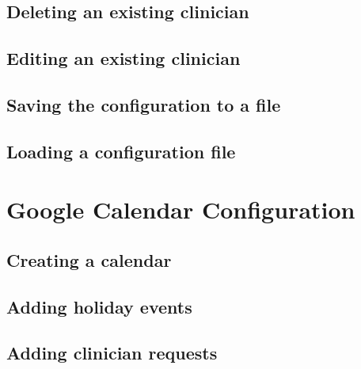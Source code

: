 \documentclass[letterpaper,10pt,english]{sphinxmanual}
\begin{document}
\begin{DUlineblock}{0em}
\item[] 
\end{DUlineblock}


\subsection{Deleting an existing clinician}
\label{\detokenize{index:deleting-an-existing-clinician}}

\subsection{Editing an existing clinician}
\label{\detokenize{index:editing-an-existing-clinician}}

\subsection{Saving the configuration to a file}
\label{\detokenize{index:saving-the-configuration-to-a-file}}

\subsection{Loading a configuration file}
\label{\detokenize{index:loading-a-configuration-file}}

\section{Google Calendar Configuration}
\label{\detokenize{index:google-calendar-configuration}}

\subsection{Creating a calendar}
\label{\detokenize{index:creating-a-calendar}}

\subsection{Adding holiday events}
\label{\detokenize{index:adding-holiday-events}}

\subsection{Adding clinician requests}
\label{\detokenize{index:adding-clinician-requests}}\label{\detokenize{index:id3}}
\end{document}
